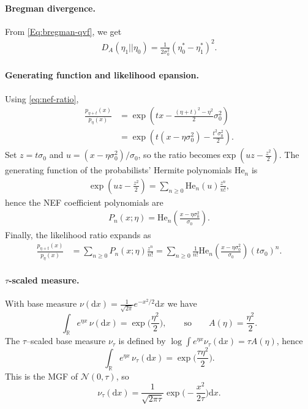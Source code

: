 \documentclass[a4paper,11pt]{article}
\numberwithin{equation}{section}
\theoremstyle{plain}
\theoremstyle{definition}
\theoremstyle{remark}
\newcommand{\R}{\ensuremath{\mathbb{R}}\xspace}
\newcommand{\1}{\ensuremath{\mathds{1}}\xspace}
\newcommand{\dd}{\ensuremath{{\textrm{d}}}\xspace}
\begin{document}
\paragraph{Bregman divergence.}
From \eqref{Eq:bregman-qvf}, we get 
\begin{align}D_A(\eta_1||\eta_0)=\frac{1}{2\sigma_0^2}\left(\eta^\ast_0-\eta^\ast_1\right)^2.
\end{align}
\paragraph{Generating function and likelihood epansion.}
Using \eqref{eq:nef-ratio},
\begin{align}
\frac{p_{\eta+t}(x)}{p_\eta(x)}
&=\exp\left(t x-\frac{(\eta+t)^2-\eta^2}{2}\sigma_0^2\right) \\
&=\exp\left(t(x-\eta\sigma_0^2)-\frac{t^2\sigma_0^2}{2}\right).
\end{align}
Set $z=t\sigma_0$ and $u=(x-\eta\sigma_0^2)/\sigma_0$, so the ratio becomes$
\exp\left(uz-\frac{z^2}{2}\right)$.
The generating function of the probabilists' Hermite polynomials $\mathrm{He}_n$ is
\begin{align}
\exp\left(uz-\frac{z^2}{2}\right)
=\sum_{n\ge 0}\mathrm{He}_n(u)\frac{z^n}{n!},
\end{align}
hence the NEF coefficient polynomials are
\begin{align}
P_n(x;\eta)
=\mathrm{He}_n\left(\frac{x-\eta\sigma_0^2}{\sigma_0}\right).
\end{align}
Finally, the likelihood ratio expands as
\begin{align}
\frac{p_{\eta+t}(x)}{p_\eta(x)}
&=\sum_{n\ge 0}P_n(x;\eta)\frac{z^n}{n!}=\sum_{n\ge 0}\frac{1}{n!}
\mathrm{He}_n\left(\frac{x-\eta\sigma_0^2}{\sigma_0}\right)
\left(t\sigma_0\right)^{\!n}.
\end{align}
\paragraph{$\tau$-scaled measure.}
With base measure $\nu(\dd x)=\frac{1}{\sqrt{2\pi}}e^{-x^2/2}\dd x$ we have
\[
\int_{\R} e^{\eta x}\,\nu(\dd x)=\exp\!\Big(\frac{\eta^2}{2}\Big),
\qquad\text{so}\qquad
A(\eta)=\frac{\eta^2}{2}.
\]
The $\tau$--scaled base measure $\nu_\tau$ is defined by $\log\int e^{\eta x}\nu_\tau(\dd x)=\tau A(\eta)$, hence
\[
\int_{\R} e^{\eta x}\,\nu_\tau(\dd x)=\exp\!\Big(\frac{\tau\eta^2}{2}\Big).
\]
This is the MGF of $\mathcal{N}(0,\tau)$, so
\[
\nu_\tau(\dd x)=\frac{1}{\sqrt{2\pi\tau}}\exp\!\Big(-\frac{x^2}{2\tau}\Big)\dd x.
\]
\end{document}
